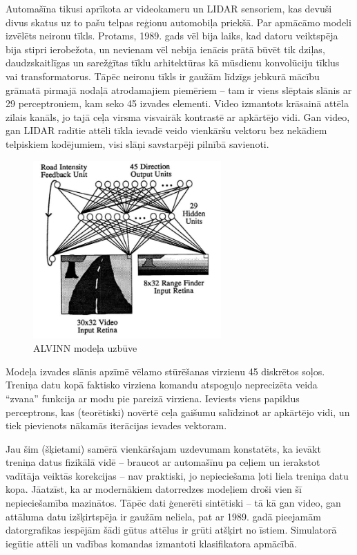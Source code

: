 \documentclass[12pt, a4paper]{article}
\numberwithin{equation}{section} %
\begin{document}
Automašīna tikusi aprīkota ar videokameru un LIDAR sensoriem, kas devuši divus skatus uz to pašu telpas reģionu automobiļa priekšā. Par apmācāmo modeli izvēlēts neironu tīkls. Protams, 1989. gads vēl bija laiks, kad datoru veiktspēja bija stipri ierobežota, un nevienam vēl nebija ienācis prātā būvēt tik dziļas, daudzskaitlīgas un sarežģītas tīklu arhitektūras kā mūsdienu konvolūciju tīklus vai transformatorus. Tāpēc neironu tīkls ir gaužām līdzīgs jebkurā mācību grāmatā pirmajā nodaļā atrodamajiem piemēriem -- tam ir viens slēptais slānis ar 29 perceptroniem, kam seko 45 izvades elementi. Video izmantots krāsainā attēla zilais kanāls, jo tajā ceļa virsma visvairāk kontrastē ar apkārtējo vidi. Gan video, gan LIDAR radītie attēli tīkla ievadē veido vienkāršu vektoru bez nekādiem telpiskiem kodējumiem, visi slāņi savstarpēji pilnībā savienoti.

\begin{figure}[t!]
    \centering
    \includegraphics[height=6.8cm,page=1]{../img/alvinn_architecture.png}
    \caption{ALVINN modeļa uzbūve \cite{pomerleau1989alvinn}}
\end{figure}

Modeļa izvades slānis apzīmē vēlamo stūrēšanas virzienu 45 diskrētos soļos. Treniņa datu kopā faktisko virziena komandu atspoguļo neprecizēta veida ``zvana'' funkcija ar modu pie pareizā virziena. Ieviests viens papildus perceptrons, kas (teorētiski) novērtē ceļa gaišumu salīdzinot ar apkārtējo vidi, un tiek pievienots nākamās iterācijas ievades vektoram.

Jau šim (šķietami) samērā vienkāršajam uzdevumam konstatēts, ka ievākt treniņa datus fizikālā vidē -- braucot ar automašīnu pa ceļiem un ierakstot vadītāja veiktās korekcijas -- nav praktiski, jo nepieciešama ļoti liela treniņa datu kopa. Jāatzīst, ka ar modernākiem datorredzes modeļiem droši vien šī nepieciešamība mazinātos. Tāpēc dati ģenerēti sintētiski -- tā kā gan video, gan attāluma datu izšķirtspēja ir gaužām neliela, pat ar 1989. gadā pieejamām datorgrafikas iespējām šādi gūtus attēlus ir grūti atšķirt no īstiem. Simulatorā iegūtie attēli un vadības komandas izmantoti klasifikatora apmācībā.
\end{document}
